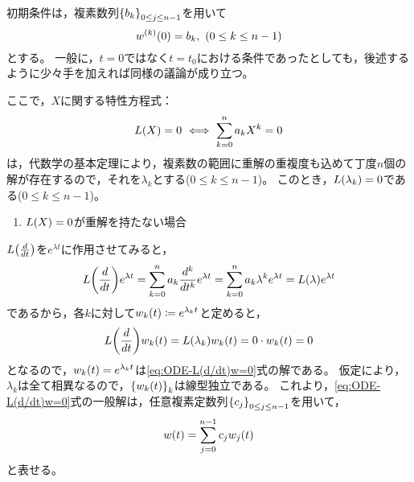 \documentclass[a4paper,draft]{ltjsarticle}
\begin{document}
初期条件は，複素数列$\seq{b_k}{0\leq j\leq n-1}$を用いて
\begin{equation}
    \diffun{w}{k}{0}=b_k,\ \pare{0\leq k\leq n-1}
    \label{eq:ODE-IC}
\end{equation}
とする。
一般に，$t=0$ではなく$t=t_0$における条件であったとしても，後述するように少々手を加えれば同様の議論が成り立つ。

ここで，$X$に関する特性方程式：
\begin{equation}
    \fun{L}{X}=0\ \Longleftrightarrow\ 
    \sum_{k=0}^n a_k X^k=0
\end{equation}
は，代数学の基本定理により，複素数の範囲に重解の重複度も込めて丁度$n$個の解が存在するので，それを$\lambda_k$とする($0\leq k\leq n-1$)。
このとき，$\fun{L}{\lambda_k}=0$である($0\leq k \leq n-1$)。

\begin{enumerate}[label=(\roman*)]
    \item $\fun{L}{X}=0$が重解を持たない場合
\end{enumerate}
$\fun{L}{\diff{}{t}}$を$e^{\lambda t}$に作用させてみると，
\begin{equation}
    \fun{L}{\diff{}{t}}e^{\lambda t}
    =\sum_{k=0}^n a_k \diffn{}{t}{k} e^{\lambda t}
    =\sum_{k=0}^n a_k \lambda^k e^{\lambda t}
    =\fun{L}{\lambda}e^{\lambda t}
\end{equation}
であるから，各$k$に対して$\fun{w_k}{t}\coloneqq e^{\lambda_k t}$と定めると，
\begin{equation}
    \fun{L}{\diff{}{t}}\fun{w_k}{t}=\fun{L}{\lambda_k}\fun{w_k}{t}=0\cdot \fun{w_k}{t}=0
\end{equation}
となるので，$\fun{w_k}{t}=e^{\lambda_k t}$は\eqref{eq:ODE-L(d/dt)w=0}式の解である。
仮定により，$\lambda_k$は全て相異なるので，$\seq{\fun{w_k}{t}}{k}$は線型独立である。
これより，\eqref{eq:ODE-L(d/dt)w=0}式の一般解は，任意複素定数列$\seq{c_j}{0\leq j\leq n-1}$を用いて，
\begin{equation}
    \fun{w}{t}=\sum_{j=0}^{n-1} c_j \fun{w_j}{t}
    \label{eq:ODE-1-GS}
\end{equation}
と表せる。
\end{document}
